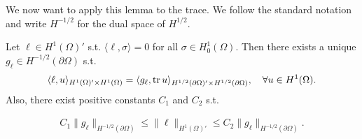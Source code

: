\documentclass[../master_thesis.tex]{subfiles}
\begin{document}
We now want to apply this lemma to the trace. 
We follow the standard notation and write $H^{-1/2}$ for the dual space of 
$H^{1/2}$.
\begin{proposition}\label{prop:existence_gl_in_H12}
    Let $\ell \in H^1(\Omega)'$ s.t. $\langle \ell, \sigma \rangle = 0$
    for all $\sigma \in H^1_0(\Omega)$. Then there exists a unique
    $g_\ell \in H^{-1/2}(\partial \Omega)$ s.t.
    \begin{align}
        \langle \ell, u \rangle_{H^1(\Omega)' \times H^1(\Omega)} 
        = \langle g_\ell, \operatorname{tr} u \rangle_{H^{1/2}(\partial \Omega)' \times H^{1/2}(\partial \Omega)}, 
            \quad \forall u \in H^1(\Omega). \label{eq:functional_as_trace_inner_product}
    \end{align}
    Also, there exist positive constants $C_1$ and $C_2$ s.t.
    
    \begin{align*}
        C_1 \lVert g_\ell \rVert _{H^{-1/2}(\partial \Omega)} \leq  \lVert \ell \rVert _{H^1(\Omega)'}
        \leq C_2 \lVert g_\ell \rVert _{H^{-1/2}(\partial \Omega)}.            
    \end{align*}
\end{proposition}
\end{document}
